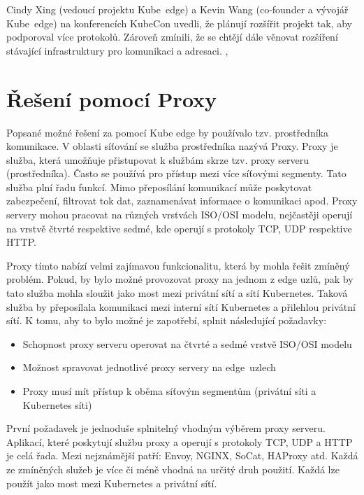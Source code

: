 Cindy Xing (vedoucí projektu Kube~edge) a Kevin Wang (co-founder a vývojář Kube~edge) na konferencích KubeCon uvedli, že plánují rozšířit projekt tak, aby podporoval více protokolů. Zároveň zmínili, že se chtějí dále věnovat rozšíření stávající infrastruktury pro komunikaci a adresaci. \cite{cncfcloudnativecomputingfoundation_2019_intro}, \cite{cncfcloudnativecomputingfoundation_2022_intro}

\section{Řešení pomocí Proxy}\label{sec:req}
Popsané možné řešení za pomocí Kube edge by používalo tzv. prostředníka komunikace. V oblasti síťování se služba prostředníka nazývá Proxy. Proxy je služba, která umožňuje přistupovat k službám skrze tzv. proxy serveru (prostředníka). Často se používá pro přístup mezi více síťovými segmenty. Tato služba plní řadu funkcí. Mimo přeposílání komunikací může poskytovat zabezpečení, filtrovat tok dat, zaznamenávat informace o komunikaci apod. Proxy servery mohou pracovat na různých vrstvách ISO/OSI modelu, nejčastěji operují na vrstvě čtvrté respektive sedmé, kde operují s protokoly TCP, UDP respektive HTTP.

Proxy tímto nabízí velmi zajímavou funkcionalitu, která by mohla řešit zmíněný problém. Pokud, by bylo možné provozovat proxy na jednom z edge uzlů, pak by tato služba mohla sloužit jako most mezi privátní sítí a sítí Kubernetes. Taková služba by přeposílala komunikaci mezi interní sítí Kubernetes a přilehlou privátní sítí. K tomu, aby to bylo možné je zapotřebí, splnit následující požadavky:

\begin{itemize}
    \item Schopnost proxy serveru operovat na čtvrté a sedmé vrstvě ISO/OSI modelu
    \item Možnost spravovat jednotlivé proxy servery na edge~uzlech
    \item Proxy musí mít přístup k oběma síťovým segmentům (privátní síti a Kubernetes síti)
\end{itemize}

První požadavek je jednoduše splnitelný vhodným výběrem proxy serveru. Aplikací, které poskytují službu proxy a operují s protokoly TCP, UDP a HTTP je celá řada. Mezi nejznámější patří: Envoy, NGINX, SoCat, HAProxy atd. Každá ze zmíněných služeb je více či méně vhodná na určitý druh použití. Každá lze použít jako most mezi Kubernetes a privátní sítí.

